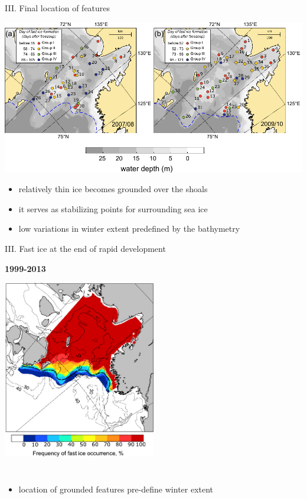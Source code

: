 \documentclass[8pt]{beamer}
\begin{document}
\setwatermark{\fontsize{125pt}{125pt}\selectfont{}}
\begin{frame}[fragile]{III. Final location of features}
	\begin{center}
		\includegraphics[width=1.0\textwidth]{./img/groups_map.pdf}
		\begin{itemize}
		\item relatively thin ice becomes grounded over the shoals \\
		\item it serves as stabilizing points for surrounding sea ice
		\item low variations in winter extent predefined by the bathymetry
		\end{itemize}
	\end{center}
\end{frame}

\setwatermark{\fontsize{125pt}{125pt}\selectfont{}}
\begin{frame}[fragile]{III. Fast ice at the end of rapid development}
	\begin{center}
		\textbf{1999-2013}
	\end{center}
\begin{center}
	\includegraphics[width=0.5\textwidth]{./img/Rgrth_freqency.pdf}
	\end{center}
	
	\begin{columns}
		\begin{itemize}
			\item location of grounded features pre-define winter extent
		\end{itemize}
	\end{columns}
\end{frame}
\end{document}
